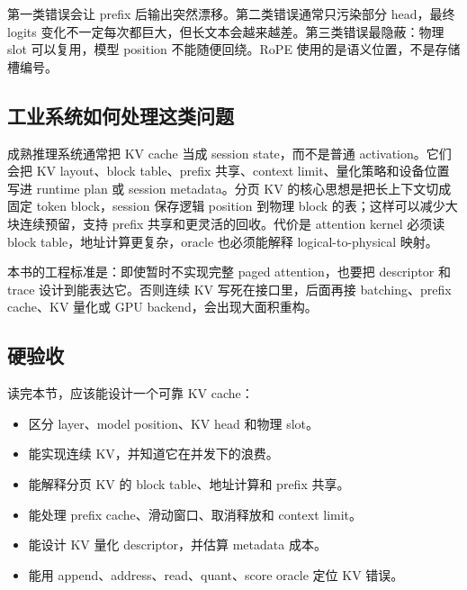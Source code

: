 第一类错误会让 prefix 后输出突然漂移。第二类错误通常只污染部分 head，最终 logits 变化不一定每次都巨大，但长文本会越来越差。第三类错误最隐蔽：物理 slot 可以复用，模型 position 不能随便回绕。RoPE 使用的是语义位置，不是存储槽编号。

\subsection{工业系统如何处理这类问题}

成熟推理系统通常把 KV cache 当成 session state，而不是普通 activation。它们会把 KV layout、block table、prefix 共享、context limit、量化策略和设备位置写进 runtime plan 或 session metadata。分页 KV 的核心思想是把长上下文切成固定 token block，session 保存逻辑 position 到物理 block 的表；这样可以减少大块连续预留，支持 prefix 共享和更灵活的回收。代价是 attention kernel 必须读 block table，地址计算更复杂，oracle 也必须能解释 logical-to-physical 映射。

本书的工程标准是：即使暂时不实现完整 paged attention，也要把 descriptor 和 trace 设计到能表达它。否则连续 KV 写死在接口里，后面再接 batching、prefix cache、KV 量化或 GPU backend，会出现大面积重构。

\subsection{硬验收}

读完本节，应该能设计一个可靠 KV cache：

\begin{itemize}
  \item 区分 layer、model position、KV head 和物理 slot。
  \item 能实现连续 KV，并知道它在并发下的浪费。
  \item 能解释分页 KV 的 block table、地址计算和 prefix 共享。
  \item 能处理 prefix cache、滑动窗口、取消释放和 context limit。
  \item 能设计 KV 量化 descriptor，并估算 metadata 成本。
  \item 能用 append、address、read、quant、score oracle 定位 KV 错误。
\end{itemize}
